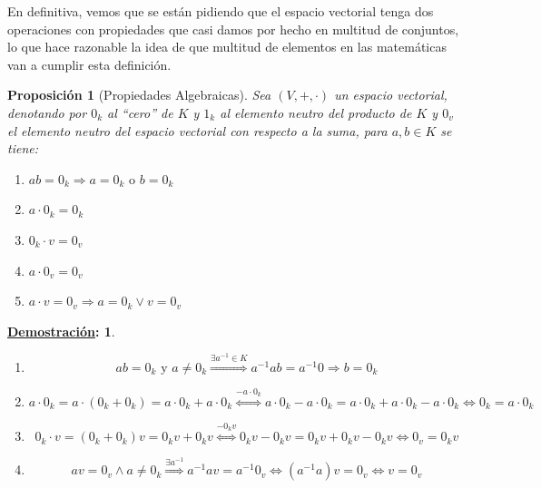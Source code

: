 \documentclass[10pt,a4paper,openright]{book}
\theoremstyle{break}
\newtheorem*{prop}{Proposición}
\newtheorem*{demo}{\underline{Demostración}:}
\begin{document}
En definitiva, vemos que se están pidiendo que el espacio vectorial tenga dos operaciones con propiedades que casi damos por hecho en multitud de conjuntos, lo que hace razonable la idea de que multitud de elementos en las matemáticas van a cumplir esta definición.

\begin{prop}[Propiedades Algebraicas]
Sea $(V,+,\cdot)$ un espacio vectorial, denotando por $0_k$ al ``cero'' de $K$ y $1_k$ al elemento neutro del producto de $K$ y $0_v$ el elemento neutro del espacio vectorial con respecto a la suma, para $a,b\in K$ se tiene: 
\begin{enumerate}
\item $ab=0_k\Rightarrow a=0_k \mbox{ o } b=0_k$
\item $a\cdot 0_k=0_k$
\item $0_k\cdot v=0_v$
\item $a\cdot 0_v=0_v$
\item $a\cdot v=0_v\Rightarrow a=0_k \vee v=0_v$
\end{enumerate}
\end{prop}
\begin{demo}
\begin{enumerate}
\item 
$$
ab=0_k\mbox{ y } a\neq 0_k \stackrel{\exists a^{-1}\in K}{\Rightarrow} a^{-1}ab=a^{-1}0\Rightarrow b=0_k
$$

\item
$$
a\cdot 0_k=a\cdot (0_k+0_k)=a\cdot 0_k+a\cdot 0_k\stackrel{-a\cdot 0_k}{\Leftrightarrow}a\cdot 0_k-a\cdot 0_k=a\cdot 0_k+a\cdot 0_k-a\cdot 0_k\Leftrightarrow 0_k=a\cdot 0_k
$$

\item
$$0_k\cdot v=(0_k+0_k)v=0_kv+0_kv\stackrel{-0_kv}{\Leftrightarrow} 0_kv-0_kv=0_kv+0_kv-0_kv\Leftrightarrow 0_v=0_kv$$

\item
$$av=0_v\wedge a\neq 0_k\stackrel{\exists a^{-1}}{\Rightarrow} a^{-1}av=a^{-1}0_v\Leftrightarrow (a^{-1}a)v=0_v\Leftrightarrow v=0_v$$
\end{enumerate}
\end{demo}
\end{document}

